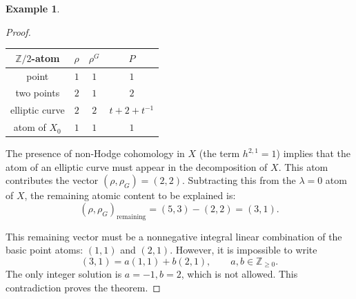 \documentclass[12pt,a4paper]{amsart}
\theoremstyle{definition}
\newtheorem{example}[theorem]{Example}
\theoremstyle{remark}
\newcommand{\Z}{\mathbb{Z}}
\begin{document}
\begin{example}
\begin{proof}


\begin{table}[h!]
    \centering
    \begin{tabular}{|c|c|c|c|}
     \hline $\Z/2$-atom  & $\rho$  & $\rho^G$ & $P$ \\ \hline \hline
      point   & $1$ & $1$ & $1$ \\ \hline
      two points   &  $2$ & $1$ & $2$  \\ \hline
    elliptic curve  & $2$ & $2$ & $t+2+t^{-1}$ \\ \hline
atom of $X_0$ & $1$ & $1$ & $1$ \\ \hline
    \end{tabular}
    \end{table}

    
The presence of non-Hodge cohomology in $X$ (the term $h^{2,1}=1$) implies that the atom of an elliptic curve must appear in the decomposition of $X$. This atom contributes the vector $(\rho,\rho_G)=(2,2)$. Subtracting this from the $\lambda=0$ atom of $X$, the remaining atomic content to be explained is:
\[
(\rho,\rho_G)_{\mathrm{remaining}}=(5,3)-(2,2)=(3,1).
\]

This remaining vector must be a nonnegative integral linear combination of the basic point atoms: $(1,1)$ and $(2,1)$. However, it is impossible to write
\[
(3,1)=a(1,1)+b(2,1), \qquad a,b\in \mathbb{Z}_{\geq 0}.
\]
The only integer solution is $a=-1,b=2$, which is not allowed. This contradiction proves the theorem. \qedhere
\end{proof}


\end{example}
\end{document}
